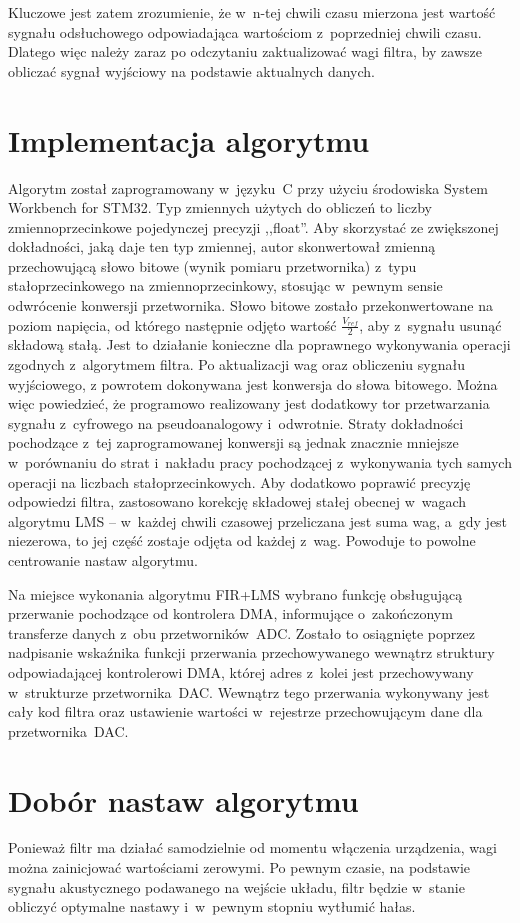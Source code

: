 Kluczowe jest zatem zrozumienie, że w~n-tej chwili czasu mierzona jest wartość sygnału odsłuchowego odpowiadająca wartościom z~poprzedniej chwili czasu. Dlatego więc należy zaraz po odczytaniu zaktualizować wagi filtra, by zawsze obliczać sygnał wyjściowy na podstawie aktualnych danych.
\section{Implementacja algorytmu}
Algorytm został zaprogramowany w~języku~C przy użyciu środowiska System Workbench for STM32. Typ zmiennych użytych do obliczeń to liczby zmiennoprzecinkowe pojedynczej precyzji ,,float''. Aby skorzystać ze zwiększonej dokładności, jaką daje ten typ zmiennej, autor skonwertował zmienną przechowującą słowo bitowe (wynik pomiaru przetwornika) z~typu stałoprzecinkowego na zmiennoprzecinkowy, stosując w~pewnym sensie odwrócenie konwersji przetwornika. Słowo bitowe zostało przekonwertowane na poziom napięcia, od którego następnie odjęto wartość $ \frac{V_{ref}}{2} $, aby z~sygnału usunąć składową stałą. Jest to działanie konieczne dla poprawnego wykonywania operacji zgodnych z~algorytmem filtra. Po aktualizacji wag oraz obliczeniu sygnału wyjściowego, z powrotem dokonywana jest konwersja do słowa bitowego. Można więc powiedzieć, że programowo realizowany jest dodatkowy tor przetwarzania sygnału z~cyfrowego na pseudoanalogowy i~odwrotnie. Straty dokładności pochodzące z~tej zaprogramowanej konwersji są jednak znacznie mniejsze w~porównaniu do strat i~nakładu pracy pochodzącej z~wykonywania tych samych operacji na liczbach stałoprzecinkowych. Aby dodatkowo poprawić precyzję odpowiedzi filtra, zastosowano korekcję składowej stałej obecnej w~wagach algorytmu LMS -- w~każdej chwili czasowej przeliczana jest suma wag, a~gdy jest niezerowa, to jej część zostaje odjęta od każdej z~wag. Powoduje to powolne centrowanie nastaw algorytmu.

Na miejsce wykonania algorytmu FIR+LMS wybrano funkcję obsługującą przerwanie pochodzące od kontrolera DMA, informujące o~zakończonym transferze danych z~obu przetworników~ADC. Zostało to osiągnięte poprzez nadpisanie wskaźnika funkcji przerwania przechowywanego wewnątrz struktury odpowiadającej kontrolerowi DMA, której adres z~kolei jest przechowywany w~strukturze przetwornika~DAC. Wewnątrz tego przerwania wykonywany jest cały kod filtra oraz ustawienie wartości w~rejestrze przechowującym dane dla przetwornika~DAC.
\section{Dobór nastaw algorytmu}
Ponieważ filtr ma działać samodzielnie od momentu włączenia urządzenia, wagi można zainicjować wartościami zerowymi. Po pewnym czasie, na podstawie sygnału akustycznego podawanego na wejście układu, filtr będzie w~stanie obliczyć optymalne nastawy i~w~pewnym stopniu wytłumić hałas.

